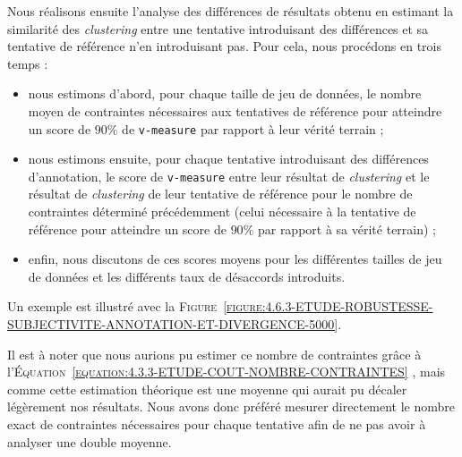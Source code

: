 			Nous réalisons ensuite l'analyse des différences de résultats obtenu en estimant la similarité des \textit{clustering} entre une tentative introduisant des différences et sa tentative de référence n'en introduisant pas.
			Pour cela, nous procédons en trois temps :
			\begin{itemize}
				\item nous estimons d'abord, pour chaque taille de jeu de données, le nombre moyen de contraintes nécessaires aux tentatives de référence pour atteindre un score de $90$\% de \texttt{v-measure} par rapport à leur vérité terrain ;
				\item nous estimons ensuite, pour chaque tentative introduisant des différences d'annotation, le score de \texttt{v-measure} entre leur résultat de \textit{clustering} et le résultat de \textit{clustering} de leur tentative de référence pour le nombre de contraintes déterminé précédemment (celui nécessaire à la tentative de référence pour atteindre un score de $90$\% par rapport à sa vérité terrain) ;
				\item enfin, nous discutons de ces scores moyens pour les différentes tailles de jeu de données et les différents taux de désaccords introduits.
			\end{itemize}
			Un exemple est illustré avec la \textsc{Figure~\ref{figure:4.6.3-ETUDE-ROBUSTESSE-SUBJECTIVITE-ANNOTATION-ET-DIVERGENCE-5000}}.
			
			\setcounter{localCounterOfFootnoteValue}{\value{footnote}}
			\begin{leftBarAuthorOpinion}
				Il est à noter que nous aurions pu estimer ce nombre de contraintes grâce à l'\textsc{Équation~\ref{equation:4.3.3-ETUDE-COUT-NOMBRE-CONTRAINTES}} \footnotemark, mais comme cette estimation théorique est une moyenne qui aurait pu décaler légèrement nos résultats.
				Nous avons donc préféré mesurer directement le nombre exact de contraintes nécessaires pour chaque tentative afin de ne pas avoir à analyser une double moyenne.
			\end{leftBarAuthorOpinion}
			

